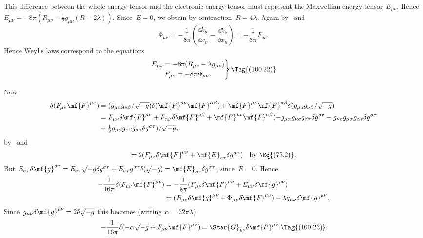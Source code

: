 \documentclass[12pt]{book}
\begin{document}
This difference between the whole energy\hyp{}tensor and the electronic energy\hyp{}tensor must represent the
Maxwellian energy\hyp{}tensor~$E_{\mu\nu}$.
Hence~$E_{\mu\nu}=-8\pi(R_{\mu\nu}-\tfrac{1}{2}g_{\mu\nu}(R-2\lambda))$.
Since~$E=0$, we obtain by contraction~$R=4\lambda$.
Again by~ and~
\[
\Phi_{\mu\nu}=-\frac{1}{8\pi}\left(\frac{\dd k_\mu}{\dd x_\nu}-\frac{\dd k_\nu}{\dd x_\mu}\right)
             =-\frac{1}{8\pi}F_{\mu\nu}.
\]
Hence Weyl's laws correspond to the equations
\[
\left.
\begin{gathered}
E_{\mu\nu} = -8\pi (R_{\mu\nu} - \lambda g_{\mu\nu})\\
F_{\mu\nu} = -8\pi \Phi_{\mu\nu}.
\end{gathered}
\right\}
\Tag{(100.22)}
\]

Now
\begin{align*}%
\delta(F_{\mu\nu}\mf{F}^{\mu\nu}) & =
   (g_{\mu\alpha}g_{\nu\beta}/\sqrt{-g})\delta(\mf{F}^{\mu\nu}\mf{F}^{\alpha\beta})
   + \mf{F}^{\mu\nu}\mf{F}^{\alpha\beta}\delta(g_{\mu\alpha}g_{\nu\beta}/\sqrt{-g})\\
& = F_{\mu\nu}\delta\mf{F}^{\mu\nu} + F_{\alpha\beta}\delta\mf{F}^{\alpha\beta}
     +\mf{F}^{\mu\nu}\mf{F}^{\alpha\beta}(-g_{\mu\alpha}g_{\nu\sigma}g_{\beta\tau}\delta g^{\sigma\tau}
      -g_{\nu\beta}g_{\mu\sigma}g_{\alpha\tau}\delta g^{\sigma\tau}\\
& + \tfrac{1}{2}g_{\mu\alpha}g_{\nu\beta}g_{\sigma\tau}\delta g^{\sigma\tau})/\sqrt{-g},
\end{align*}
by~ and~
\[
= 2(F_{\mu\nu}\delta\mf{F}^{\mu\nu} + \mf{E}_{\sigma\tau}\delta g^{\sigma\tau})\quad\text{by~\Eq{(77.2)}}.
\]
But $E_{\sigma\tau}\delta\mf{g}^{\sigma\tau}=E_{\sigma\tau}\sqrt{-g}\delta g^{\sigma\tau}+E_{\sigma\tau}g^{\sigma\tau}\delta(\sqrt{-g})=\mf{E}_{\sigma\tau}\delta g^{\sigma\tau}$, since~$E=0$.
Hence
\begin{align*}
-\frac{1}{16\pi}\delta(F_{\mu\nu}\mf{F}^{\mu\nu}) & = -\frac{1}{8\pi}(F_{\mu\nu}\delta\mf{F}^{\mu\nu} +
    E_{\mu\nu}\delta\mf{g}^{\mu\nu})\\
   & = (R_{\mu\nu}\delta\mf{g}^{\mu\nu} + \Phi_{\mu\nu}\delta\mf{F}^{\mu\nu})-\lambda g_{\mu\nu}\delta\mf{g}^{\mu\nu}.
\end{align*}
Since~$g_{\mu\nu}\delta\mf{g}^{\mu\nu}=2\delta\sqrt{-g}$ this becomes (writing~$\alpha=32\pi\lambda$)
\[
-\frac{1}{16\pi}\delta(-\alpha\sqrt{-g}+F_{\mu\nu}\mf{F}^{\mu\nu}) = \Star{G}_{\mu\nu}\delta\mf{P}^{\mu\nu}.
\Tag{(100.23)}
\]
\end{document}

